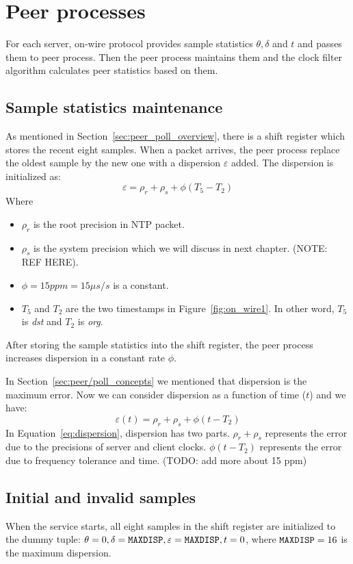 \section{Peer processes}%
\label{sec:peer_processes}
For each server, on-wire protocol provides sample statistics $\theta, \delta$
and $t$ and passes them to peer process. Then the peer process maintains them
and the clock filter algorithm calculates peer statistics based on them.

\subsection{Sample statistics maintenance}%
\label{sub:sample_statistics_maintenance}
As mentioned in Section~\ref{sec:peer_poll_overview}, there is a shift register
which stores the recent eight samples. When a packet arrives, the peer process
replace the oldest sample by the new one with a dispersion $\varepsilon$ added.
The dispersion is initialized as:
$$ \varepsilon = \rho_r + \rho_s + \phi (T_5 - T_2) $$
Where 
\begin{itemize}
    \item 
        $\rho_r$ is the root precision in NTP packet. 
    \item 
        $\rho_s$ is the system
        precision which we will discuss in next chapter. (NOTE: REF HERE).
    \item
        $\phi = 15 ppm = 15 \mu s/s$ is a constant.
    \item
        $T_5$ and $T_2$ are the two timestamps in Figure~\ref{fig:on_wire1}. In
        other word, $T_5$ is \emph{dst} and $T_2$ is \emph{org}.
\end{itemize}
After storing the sample statistics into the shift register, the peer process
increases dispersion in a constant rate $\phi$.

In Section~\ref{sec:peer/poll_concepts} we mentioned that dispersion is the
maximum error. Now we can consider dispersion as a function of time ($t$) and
we have:
\begin{equation}
    \varepsilon(t) = \rho_r + \rho_s + \phi (t - T_2)
    \label{eq:dispersion}
\end{equation}
In Equation~\ref{eq:dispersion}, dispersion has two parts. $\rho_r + \rho_s$
represents the error due to the precisions of server and client clocks. $\phi
(t - T_2)$ represents the error due to frequency tolerance and time.
(TODO: add more about 15 ppm)

\subsection{Initial and invalid samples}%
\label{sub:initial_and_invalid_samples}
When the service starts, all eight samples in the shift register are
initialized to the dummy tuple: $\theta = 0, \delta = \verb|MAXDISP|,
\varepsilon = \verb|MAXDISP|, t = 0$, where $\verb|MAXDISP| = 16$ is the
maximum dispersion.~\cite{rfc5905} 

